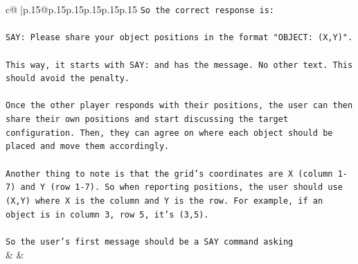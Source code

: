 \documentclass{article}
\begin{document}
{\begin{supertabular}{c@{$\;$}|p{.15\linewidth}@{}p{.15\linewidth}p{.15\linewidth}p{.15\linewidth}p{.15\linewidth}p{.15\linewidth}}
{{{\texttt{So the correct response is:} \\
\\ 
\texttt{SAY: Please share your object positions in the format "OBJECT: (X,Y)".} \\
\\ 
\texttt{This way, it starts with SAY: and has the message. No other text. This should avoid the penalty.} \\
\\ 
\texttt{Once the other player responds with their positions, the user can then share their own positions and start discussing the target configuration. Then, they can agree on where each object should be placed and move them accordingly.} \\
\\ 
\texttt{Another thing to note is that the grid's coordinates are X (column 1{-}7) and Y (row 1{-}7). So when reporting positions, the user should use (X,Y) where X is the column and Y is the row. For example, if an object is in column 3, row 5, it's (3,5).} \\
\\ 
\texttt{So the user's first message should be a SAY command asking} \\
            }
        }
    }
    & & \\ \\


\end{supertabular}}
\end{document}
